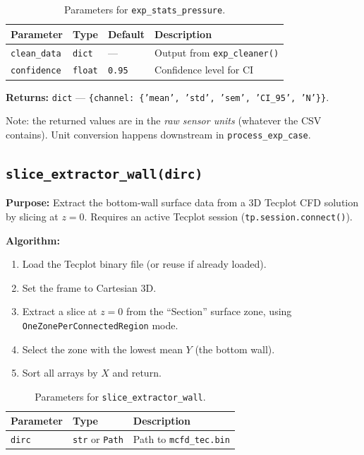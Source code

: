 \documentclass[11pt, letterpaper]{article}
\begin{document}
\begin{table}[h!]
\centering
\caption{Parameters for \texttt{exp\_stats\_pressure}.}
\begin{tabular}{@{}llll@{}}
\toprule
\textbf{Parameter} & \textbf{Type} & \textbf{Default} & \textbf{Description} \\
\midrule
\texttt{clean\_data} & \texttt{dict}  & ---       & Output from \texttt{exp\_cleaner()} \\
\texttt{confidence}  & \texttt{float} & \texttt{0.95} & Confidence level for CI \\
\bottomrule
\end{tabular}
\end{table}

\textbf{Returns:} \texttt{dict} ---
\texttt{\{channel: \{'mean', 'std', 'sem', 'CI\_95', 'N'\}\}}.

Note: the returned values are in the \emph{raw sensor units} (whatever
the CSV contains). Unit conversion happens downstream in
\texttt{process\_exp\_case}.

\subsection{\texttt{slice\_extractor\_wall(dirc)}}
\label{subsec:slice_extractor_wall}

\textbf{Purpose:} Extract the bottom-wall surface data from a 3D
Tecplot CFD solution by slicing at $z = 0$. Requires an active Tecplot
session (\texttt{tp.session.connect()}).

\textbf{Algorithm:}
\begin{enumerate}[nosep]
    \item Load the Tecplot binary file (or reuse if already loaded).
    \item Set the frame to Cartesian 3D.
    \item Extract a slice at $z = 0$ from the ``Section'' surface zone,
          using \texttt{OneZonePerConnectedRegion} mode.
    \item Select the zone with the lowest mean $Y$ (the bottom wall).
    \item Sort all arrays by $X$ and return.
\end{enumerate}

\begin{table}[h!]
\centering
\caption{Parameters for \texttt{slice\_extractor\_wall}.}
\begin{tabular}{@{}lll@{}}
\toprule
\textbf{Parameter} & \textbf{Type} & \textbf{Description} \\
\midrule
\texttt{dirc} & \texttt{str} or \texttt{Path} & Path to \texttt{mcfd\_tec.bin} \\
\bottomrule
\end{tabular}
\end{table}
\end{document}
